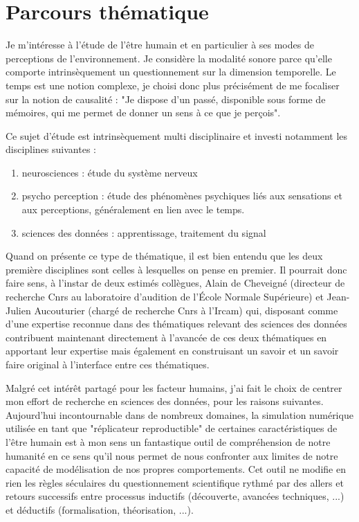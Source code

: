 \chapter{Parcours thématique}

Je m'intéresse à l'étude de l'être humain et en particulier à ses modes de perceptions de l'environnement. Je considère la modalité sonore parce qu'elle comporte intrinsèquement un questionnement sur la dimension temporelle. Le temps est une notion complexe, je choisi donc plus précisément de me focaliser sur la notion de causalité : "Je dispose d'un passé, disponible sous forme de mémoires, qui me permet de donner un sens à ce que je perçois".

Ce sujet d'étude est intrinsèquement multi disciplinaire et investi notamment les disciplines suivantes :
\begin{enumerate}
  \item neurosciences : étude du système nerveux
  \item psycho perception : étude des phénomènes psychiques liés aux sensations et aux perceptions, généralement en lien avec le temps.
  \item sciences des données : apprentissage, traitement du signal
\end{enumerate}

Quand on présente  ce type de thématique, il est bien entendu que les deux première disciplines sont  celles à lesquelles on pense en premier. Il pourrait donc faire sens, à l'instar de deux estimés collègues, Alain de Cheveigné (directeur de recherche Cnrs au laboratoire d'audition de l'\'Ecole Normale Supérieure) et Jean-Julien Aucouturier (chargé de recherche Cnrs à l'Ircam) qui, disposant comme d'une expertise reconnue dans des thématiques relevant des sciences des données contribuent maintenant directement à l'avancée de ces deux thématiques en apportant leur expertise mais également en construisant un savoir et un savoir faire original à l'interface entre ces thématiques.

Malgré cet intérêt partagé pour les facteur humains, j'ai fait le choix de centrer mon effort de recherche en sciences des données, pour les raisons suivantes. Aujourd'hui incontournable dans de nombreux domaines, la simulation numérique utilisée en tant que "réplicateur reproductible" de certaines caractéristiques de l'être humain est à mon sens un fantastique outil de compréhension de notre humanité en ce sens qu'il nous permet de nous confronter aux limites de notre capacité de modélisation de nos propres comportements. Cet outil ne modifie en rien les règles séculaires du questionnement scientifique rythmé par des allers et retours successifs entre processus inductifs (découverte, avancées techniques, ...) et déductifs (formalisation, théorisation, ...).

